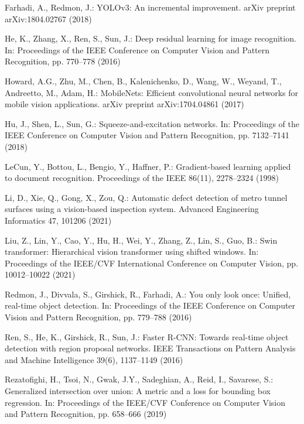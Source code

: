 \documentclass[twocolumn]{sn-jnl}
\begin{document}
		Farhadi, A., Redmon, J.: YOLOv3: An incremental improvement. arXiv preprint arXiv:1804.02767 (2018)
		
		He, K., Zhang, X., Ren, S., Sun, J.: Deep residual learning for image recognition. In: Proceedings of the IEEE Conference on Computer Vision and Pattern Recognition, pp. 770–778 (2016)
		
		Howard, A.G., Zhu, M., Chen, B., Kalenichenko, D., Wang, W., Weyand, T., Andreetto, M., Adam, H.: MobileNets: Efficient convolutional neural networks for mobile vision applications. arXiv preprint arXiv:1704.04861 (2017)
		
		Hu, J., Shen, L., Sun, G.: Squeeze-and-excitation networks. In: Proceedings of the IEEE Conference on Computer Vision and Pattern Recognition, pp. 7132–7141 (2018)
		
		LeCun, Y., Bottou, L., Bengio, Y., Haffner, P.: Gradient-based learning applied to document recognition. Proceedings of the IEEE 86(11), 2278–2324 (1998)
		
		Li, D., Xie, Q., Gong, X., Zou, Q.: Automatic defect detection of metro tunnel surfaces using a vision-based inspection system. Advanced Engineering Informatics 47, 101206 (2021)
		
		Liu, Z., Lin, Y., Cao, Y., Hu, H., Wei, Y., Zhang, Z., Lin, S., Guo, B.: Swin transformer: Hierarchical vision transformer using shifted windows. In: Proceedings of the IEEE/CVF International Conference on Computer Vision, pp. 10012–10022 (2021)
		
		Redmon, J., Divvala, S., Girshick, R., Farhadi, A.: You only look once: Unified, real-time object detection. In: Proceedings of the IEEE Conference on Computer Vision and Pattern Recognition, pp. 779–788 (2016)
		
		Ren, S., He, K., Girshick, R., Sun, J.: Faster R-CNN: Towards real-time object detection with region proposal networks. IEEE Transactions on Pattern Analysis and Machine Intelligence 39(6), 1137–1149 (2016)
		
		Rezatofighi, H., Tsoi, N., Gwak, J.Y., Sadeghian, A., Reid, I., Savarese, S.: Generalized intersection over union: A metric and a loss for bounding box regression. In: Proceedings of the IEEE/CVF Conference on Computer Vision and Pattern Recognition, pp. 658–666 (2019)
		
\end{document}
